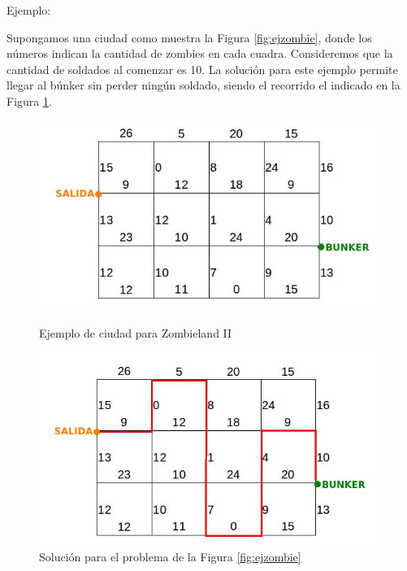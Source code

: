Ejemplo: 

Supongamos una ciudad como muestra la Figura \ref{fig:ejzombie}, donde los números indican la cantidad de zombies en cada cuadra. Consideremos que la cantidad de soldados al comenzar es 10.
%
%
La solución para este ejemplo permite llegar al búnker sin perder ningún soldado, siendo el recorrido el indicado en la Figura \ref{fig:ejzombieres}.
%

\begin{figure}[!htb]
  \includegraphics[scale=0.5]{imagenes/ejemplozombie.jpeg}
  \caption{Ejemplo de ciudad para Zombieland II}\label{fig:ejzombie}
\endminipage
{}
  \includegraphics[scale=0.5]{imagenes/ejemplozombieres.jpeg}
  \caption{Solución para el problema de la Figura \ref{fig:ejzombie}}\label{fig:ejzombieres}
\endminipage
\end{figure}


